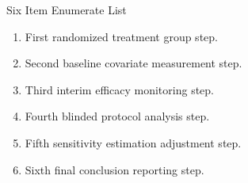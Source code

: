 \documentclass[14pt,t]{beamer-accessibility}
\begin{document}
\begin{frame}{Six Item Enumerate List}
\begin{enumerate}
\item First randomized treatment group step.
\item Second baseline covariate measurement step.
\item Third interim efficacy monitoring step.
\item Fourth blinded protocol analysis step.
\item Fifth sensitivity estimation adjustment step.
\item Sixth final conclusion reporting step.
\end{enumerate}
\end{frame}
\end{document}
